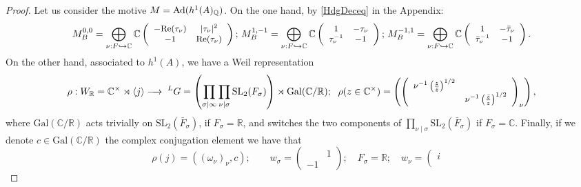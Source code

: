 \documentclass{amsart}
\theoremstyle{definition}
\theoremstyle{remark}
\numberwithin{equation}{section}
\newcommand{\Gal}{{\mathrm {Gal}}}
\newcommand{\SL}{{\mathrm {SL}}}
\newcommand{\Q}{{\mathbb Q}}
\newcommand{\C}{{\mathbb C}}
\newcommand{\R}{{\mathbb R}}
\begin{document}
\begin{proof}
 Let us consider the motive $M={\rm Ad}(h^1(A)_\Q)$. On the one hand, by \eqref{HdgDeceq} in the Appendix:
\begin{equation*}
  \begin{small}
    M_B^{0,0}=\bigoplus_{{\nu}:F\hookrightarrow\C}\C\left(\begin{array}{cc}-{\rm Re}(\tau_\nu)&|\tau_\nu|^2\\-1&{\rm Re}(\tau_\nu)\end{array}\right);\,  M_B^{1,-1}=\bigoplus_{{\nu}:F\hookrightarrow\C}\C\left(\begin{array}{cc}1&-\tau_\nu\\\tau_\nu^{-1}&-1\end{array}\right); \,  M_B^{-1,1}=\bigoplus_{{\nu}:F\hookrightarrow\C}\C\left(\begin{array}{cc}1&-\bar\tau_\nu\\\bar\tau_\nu^{-1}&-1\end{array}\right).\end{small}
    \end{equation*}
On the other hand, associated to $h^1(A)$, we have a Weil representation 
\begin{equation*}\label{Weilreprho}
    \begin{small}
\rho:W_\R=\C^\times\rtimes\langle j\rangle\longrightarrow \;^LG=\left(\prod_{\sigma\mid\infty}\prod_{\nu\mid\sigma}\SL_2( F_\sigma)\right)\rtimes\Gal(\C/\R);\ \ \rho(z\in \C^\times)=\left(\left(\begin{array}{cc}
   \nu^{-1}\left(\frac{z}{\bar z}\right)^{1/2}  &  \\
     & \nu^{-1}\left(\frac{\bar z}{ z}\right)^{1/2}
\end{array}\right)_{\nu}\right),  \end{small}
\end{equation*}
where $\Gal(\C/\R)$ acts trivially on $\SL_2(\bar F_\sigma)$, if $F_\sigma=\R$, and switches the two components of $\prod_{\nu\mid\sigma}\SL_2(\bar F_\sigma)$ if $F_\sigma=\C$. Finally, if we denote $c\in\Gal(\C/\R)$ the complex conjugation element we have that
\[
\rho(j)=\left(\left(\omega_{\nu}\right)_{\nu},c\right);\qquad w_{\sigma}=\left(\begin{array}{cc}
     & 1 \\
    -1 & 
\end{array}\right);\quad F_\sigma=\R;\quad w_{\nu}=\left(\begin{array}{cc}
    i &  \\

\end{array}\]
\end{proof}
\end{document}
